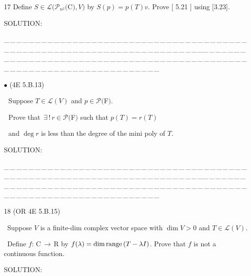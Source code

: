 \documentclass[a4paper, 11pt, UTF8]{article}
\def\range{\textup{range}\,}
\def\Lm{\mathcal{L}}
\def\Po{\mathcal{P}}
\def\Rbf{$\,{\timesbf R}\,$}
\def\Cbf{$\,{\timesbf C}\,$}
\begin{document}
\begin{large}
{\timesbf\Large 17} {\timessl\Large 
Define $S\in\Lm(\Po_{n^2}(${\timesbf C}$),V)$ by $S(p)=p(T)v.$ Prove $[$ 5.21 $]$ using $[$3.23$].$
}\par
{\timesbf S\footnotesize{OLUTION:}}\par\quad

\par
{\tiny \_\,\_\,\_\,\_\,\_\,\_\,\_\,\_\,\_\,\_\,\_\,\_\,\_\,\_\,\_\,\_\,\_\,\_\,\_\,\_\,\_\,\_\,\_\,\_\,\_\,\_\,\_\,\_\,\_\,\_\,\_\,\_\,\_\,\_\,\_\,\_\,\_\,\_\,\_\,\_\,\_\,\_\,\_\,\_\,\_\,\_\,\_\,\_\,\_\,\_\,\_\,\_\,\_\,\_\,\_\,\_\,\_\,\_\,\_\,\_\,\_\,\_\,\_\,\_\,\_\,\_\,\_\,\_\,\_\,\_\,\_\_\,\_\,\_\,\_\,\_\,\_\,\_\,\_\,\_\,\_\,\_\,\_\,\_\,\_\,\_\,\_\,\_\,\_\,\_\,\_\,\_\,\_\,\_\,\_\,\_\,\_\,\_\,\_\,\_\,\_\,\_\,\_\,\_\,\_\,\_\,\_\,\_\,\_\,\_\,\_\,\_\,\_\,\_\,\_\,\_\,\_\,\_\,\_\,\_\,\_\,\_\,\_\,\_\,\_\,\_\,\_\,\_\,\_\,\_\,\_\,\_\,\_\,\_\,\_\,\_\,\_\,\_\,\_\,\_\,\_\,\_}\par


{\small $\bullet$} (\normalsize{4E 5.B.13})\par\,\, {\timessl\Large 
Suppose $T\in \Lm(V)$ and $p \in \Po(${\timesbf F}$)$.}\par\,\,
{\timessl\Large Prove that $\,\exists\,!\,r \in \Po(${\timesbf F}$)$ such that $p(T) = r(T)$}\par\,\,
{\timessl\Large and $\deg r$ is less than the degree of the mini poly of $T$.
}\par
{\timesbf S\footnotesize{OLUTION:}}\par\quad

\par
{\tiny \_\,\_\,\_\,\_\,\_\,\_\,\_\,\_\,\_\,\_\,\_\,\_\,\_\,\_\,\_\,\_\,\_\,\_\,\_\,\_\,\_\,\_\,\_\,\_\,\_\,\_\,\_\,\_\,\_\,\_\,\_\,\_\,\_\,\_\,\_\,\_\,\_\,\_\,\_\,\_\,\_\,\_\,\_\,\_\,\_\,\_\,\_\,\_\,\_\,\_\,\_\,\_\,\_\,\_\,\_\,\_\,\_\,\_\,\_\,\_\,\_\,\_\,\_\,\_\,\_\,\_\,\_\,\_\,\_\,\_\,\_\_\,\_\,\_\,\_\,\_\,\_\,\_\,\_\,\_\,\_\,\_\,\_\,\_\,\_\,\_\,\_\,\_\,\_\,\_\,\_\,\_\,\_\,\_\,\_\,\_\,\_\,\_\,\_\,\_\,\_\,\_\,\_\,\_\,\_\,\_\,\_\,\_\,\_\,\_\,\_\,\_\,\_\,\_\,\_\,\_\,\_\,\_\,\_\,\_\,\_\,\_\,\_\,\_\,\_\,\_\,\_\,\_\,\_\,\_\,\_\,\_\,\_\,\_\,\_\,\_\,\_\,\_\,\_\,\_\,\_\,\_}\par

{\timesbf\Large 18} (\normalsize{O{\small R} 4E 5.B.15})\par\quad\, {\timessl\Large 
Suppose $V$ is a finite-dim complex vector space with $\dim V > 0$ and $T\in\Lm(V)$.}\par\quad\,
{\timessl\Large Define $f:\Cbf\rightarrow\Rbf\,$by $f(\lambda) = \dim \range(T-\lambda I)$.
Prove that $f$ is not a continuous function.
}\par
{\timesbf S\footnotesize{OLUTION:}}\par\quad


\end{large}
\end{document}
